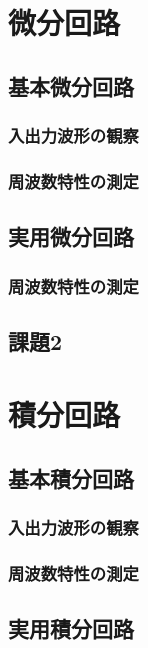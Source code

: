 \documentclass[titlepage]{jsarticle}
\begin{document}
\section{微分回路}
    
    \subsection{基本微分回路}

        \subsubsection{入出力波形の観察}

        \subsubsection{周波数特性の測定}

    \subsection{実用微分回路}

        \subsubsection{周波数特性の測定}

    \subsection{課題2}

\section{積分回路}

    \subsection{基本積分回路}

        \subsubsection{入出力波形の観察}

        \subsubsection{周波数特性の測定}

    \subsection{実用積分回路}
\end{document}
